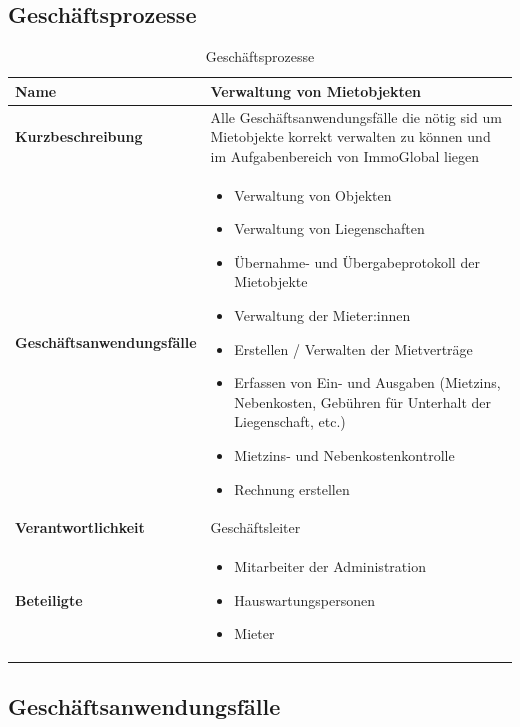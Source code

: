 \subsection{Geschäftsprozesse}
\begin{table}[H]
  \centering
  \settowidth{}
  \setlength\extrarowheight{2pt}
  \begin{tabulary}{1.0\textwidth}{|a|m{12cm}|}
    \hline
    \textbf{Name}& Verwaltung von Mietobjekten \\
    \hline 
    \textbf{Kurzbeschreibung} & Alle Geschäftsanwendungsfälle die nötig sid um Mietobjekte korrekt verwalten zu können und im Aufgabenbereich von ImmoGlobal liegen\\
    \hline
    \textbf{Geschäftsanwendungsfälle} & 
    \begin{itemize}
      \item Verwaltung von Objekten
      \item Verwaltung von Liegenschaften
      \item Übernahme- und Übergabeprotokoll der Mietobjekte
      \item Verwaltung der Mieter:innen
      \item Erstellen / Verwalten der Mietverträge
      \item Erfassen von Ein- und Ausgaben  (Mietzins, Nebenkosten, Gebühren für Unterhalt der Liegenschaft, etc.)
      \item Mietzins- und Nebenkostenkontrolle
      \item Rechnung erstellen
    \end{itemize}\\
    \hline
    \textbf{Verantwortlichkeit} & Geschäftsleiter\\
    \hline
    \textbf{Beteiligte} & 
    \begin{itemize}
      \item Mitarbeiter der Administration
      \item Hauswartungspersonen
      \item Mieter
    \end{itemize}\\
    \hline
  \end{tabulary}
  \caption{Geschäftsprozesse}
\end{table}


\subsection{Geschäftsanwendungsfälle}


